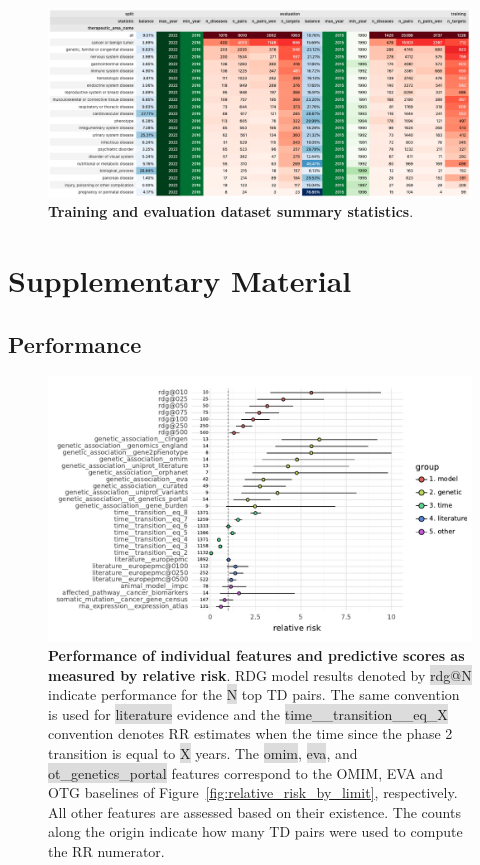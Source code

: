 \documentclass{article}
\begin{document}
\begin{figure}[!htb]
  \centering
  \captionsetup{width=.9\linewidth}
  \includegraphics[width=1\textwidth]{dataset_statistics.png}
  \caption{
    \textbf{Training and evaluation dataset summary statistics}.
  }
  \label{fig:dataset_statistics}
\end{figure}


\section{Supplementary Material}

\subsection{Performance}

\begin{figure}[H]
  \centering
  \captionsetup{width=.9\linewidth}
  \includegraphics[width=1\textwidth]{relative_risk_core_features.pdf}
  \caption{
    \textbf{Performance of individual features and predictive scores as measured by relative risk}.
    RDG model results denoted by \colorbox{Gainsboro}{rdg@N} indicate performance for the \colorbox{Gainsboro}{N} top TD pairs. The same convention is used for \colorbox{Gainsboro}{literature} evidence and the \colorbox{Gainsboro}{time\_\_transition\_\_eq\_X} convention denotes RR estimates when the time since the phase 2 transition is equal to \colorbox{Gainsboro}{X} years. The \colorbox{Gainsboro}{omim}, \colorbox{Gainsboro}{eva}, and \colorbox{Gainsboro}{ot\_genetics\_portal} features correspond to the OMIM, EVA and OTG baselines of Figure~\ref{fig:relative_risk_by_limit}, respectively. All other features are assessed based on their existence. The counts along the origin indicate how many TD pairs were used to compute the RR numerator.
  }
  \label{fig:relative_risk_core_features}
\end{figure}
\end{document}
